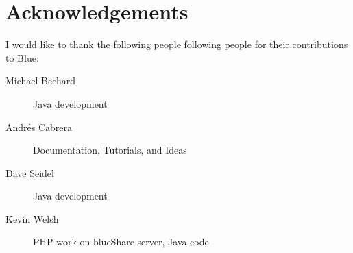 \chapter*{Acknowledgements}
\label{acknowledgements}

I would like to thank the following people following people for their
contributions to Blue:

\begin{description}
\item[Michael Bechard]
Java development
\item[Andrés Cabrera]
Documentation, Tutorials, and Ideas
\item[Dave Seidel]
Java development
\item[Kevin Welsh]
PHP work on blueShare server, Java code
\end{description}
